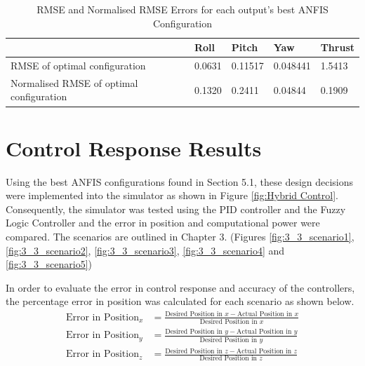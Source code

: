 \begin{table}[H]
\centering
    \begin{tabular}{@{}lllll@{}}
        \toprule
        & Roll   & Pitch   & Yaw      & Thrust \\
        \midrule
        RMSE of   optimal configuration & 0.0631 & 0.11517 & 0.048441 & 1.5413 \\
        Normalised RMSE of optimal configuration & 0.1320 & 0.2411  & 0.04844  & 0.1909 \\
        \bottomrule     
    \end{tabular}
    \caption{RMSE and Normalised RMSE Errors for each output's best ANFIS Configuration}
    \label{tab:table_errors}
\end{table}
\section{Control Response Results}
Using the best ANFIS configurations found in Section 5.1, these design decisions were implemented into the simulator as shown in Figure \ref{fig:Hybrid Control}. Consequently, the simulator was tested using the PID controller and the Fuzzy Logic Controller and the error in position and computational power were compared. The scenarios are outlined in Chapter 3. (Figures \ref{fig:3_3_scenario1}, \ref{fig:3_3_scenario2}, \ref{fig:3_3_scenario3}, \ref{fig:3_3_scenario4} and \ref{fig:3_3_scenario5})

In order to evaluate the error in control response and accuracy of the controllers, the percentage error in position was calculated for each scenario as shown below. 
\begin{align}
\textrm{{Error in Position}}_{x} &= \frac{{\textrm{{Desired Position in }} x - \textrm{{Actual Position in }} x}}{{\textrm{{Desired Position in }} x}} \\
\textrm{{Error in Position}}_{y} &= \frac{{\textrm{{Desired Position in }} y - \textrm{{Actual Position in }} y}}{{\textrm{{Desired Position in }} y}} \\
\textrm{{Error in Position}}_{z} &= \frac{{\textrm{{Desired Position in }} z - \textrm{{Actual Position in }} z}}{{\textrm{{Desired Position in }} z}}\label{eq:zain1}
\end{align}

